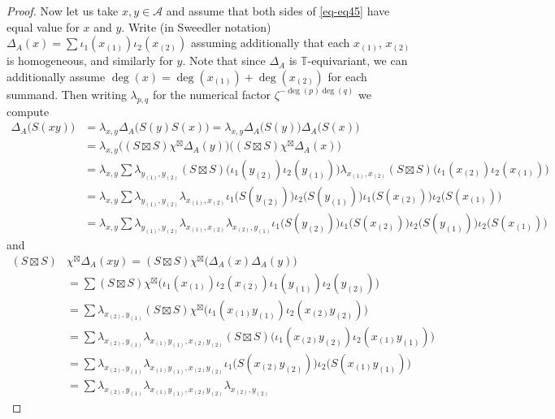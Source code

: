 \documentclass[10pt,a4paper]{amsart}
\newcommand{\TT}{\mathbb{T}}
\newcommand{\cA}{\mathscr{A}}
\begin{document}
\begin{proof}
Now let us take $x,y\in\cA$ and assume that both sides of \eqref{eq-eq45} have equal value for $x$ and $y$. Write (in Sweedler notation) $\Delta_A(x)=\sum \iota_1(x_{(1)})\iota_2(x_{(2)})$ assuming additionally that each $x_{(1)}$, $x_{(2)}$ is homogeneous, and similarly for $y$. Note that since $\Delta_A$ is $\TT$-equivariant, we can additionally assume $\deg(x)=\deg(x_{(1)})+\deg(x_{(2)})$ for each summand. Then writing $\lambda_{p,q}$ for the numerical factor $\zeta^{-\deg(p)\deg(q)}$ we compute
\begin{align*}
\Delta_A\bigl(S(xy)\bigr)
&=\lambda_{x,y}\Delta_A\bigl(S(y)S(x)\bigr)
=\lambda_{x,y}\Delta_A\bigl(S(y)\bigr)\Delta_A\bigl(S(x)\bigr)\\
&=\lambda_{x,y}\bigl((S\boxtimes S)\chi^\boxtimes\Delta_A(y)\bigr)
\bigl((S\boxtimes S)\chi^\boxtimes\Delta_A(x)\bigr)\\
&=\lambda_{x,y}\sum
\lambda_{y_{(1)},y_{(2)}}
(S\boxtimes S)\bigl(\iota_1(y_{(2)})\iota_2(y_{(1)})\bigr)
\lambda_{x_{(1)},x_{(2)}}(S\boxtimes S)\bigl(\iota_1(x_{(2)})\iota_2(x_{(1)})\bigr)\\
&=\lambda_{x,y}
\sum\lambda_{y_{(1)},y_{(2)}}
\lambda_{x_{(1)},x_{(2)}}
\iota_1\bigl(S(y_{(2)})\bigr)\iota_2\bigl(S(y_{(1)})\bigr)
\iota_1\bigl(S(x_{(2)})\bigr)\iota_2\bigl(S(x_{(1)})\bigr)\\
&=\lambda_{x,y}
\sum\lambda_{y_{(1)},y_{(2)}}
\lambda_{x_{(1)},x_{(2)}}\lambda_{x_{(2)},y_{(1)}}\iota_1\bigl(S(y_{(2)})\bigr)
\iota_1\bigl(S(x_{(2)})\bigr)\iota_2\bigl(S(y_{(1)})\bigr)\iota_2\bigl(S(x_{(1)})\bigr)
\end{align*}
and
\begin{align*}
(S\boxtimes S)&\chi^\boxtimes\Delta_A(xy)
=(S\boxtimes S)\chi^\boxtimes\bigl(\Delta_A(x)\Delta_A(y)\bigr)\\
&=\sum(S\boxtimes S)\chi^\boxtimes
\bigl(\iota_1(x_{(1)})\iota_2(x_{(2)})\iota_1(y_{(1)})\iota_2(y_{(2)})\bigr)\\
&=\sum\lambda_{x_{(2)},y_{(1)}}
(S\boxtimes S)\chi^\boxtimes\bigl(\iota_1(x_{(1)}y_{(1)})\iota_2(x_{(2)}y_{(2)})\bigr)\\
&=\sum\lambda_{x_{(2)},y_{(1)}}\lambda_{x_{(1)}y_{(1)},x_{(2)}y_{(2)}}
(S\boxtimes S)\bigl(\iota_1( x_{(2)}y_{(2)})\iota_2(x_{(1)}y_{(1)})\bigr)\\
&=\sum\lambda_{x_{(2)},y_{(1)}}
\lambda_{x_{(1)}y_{(1)},x_{(2)}y_{(2)}}
\iota_1\bigl(S(x_{(2)}y_{(2)})\bigr)\iota_2\bigl(S(x_{(1)}y_{(1)})\bigr)\\
&=\sum\lambda_{x_{(2)},y_{(1)}}
\lambda_{x_{(1)}y_{(1)},x_{(2)}y_{(2)}}
\lambda_{x_{(2)},y_{(2)}}

\end{align*}
\end{proof}
\end{document}

